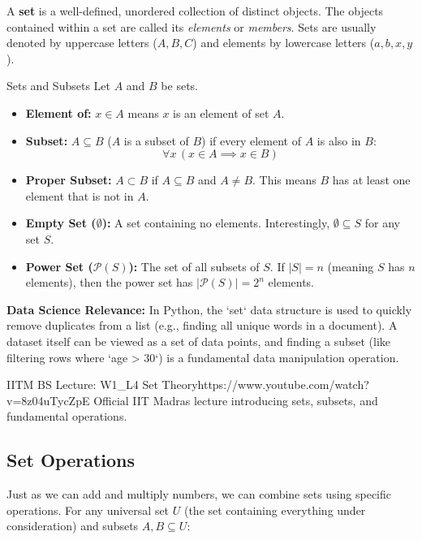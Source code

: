 A \textbf{set} is a well-defined, unordered collection of distinct objects. The objects contained within a set are called its \textit{elements} or \textit{members}. Sets are usually denoted by uppercase letters ($A, B, C$) and elements by lowercase letters ($a, b, x, y$).

\begin{definitionbox}{Sets and Subsets}
Let $A$ and $B$ be sets.
\begin{itemize}
    \item \textbf{Element of:} $x \in A$ means $x$ is an element of set $A$.
    \item \textbf{Subset:} $A \subseteq B$ ($A$ is a subset of $B$) if every element of $A$ is also in $B$:
    $$\forall x \, (x \in A \implies x \in B)$$
    \item \textbf{Proper Subset:} $A \subset B$ if $A \subseteq B$ and $A \neq B$. This means $B$ has at least one element that is not in $A$.
    \item \textbf{Empty Set ($\emptyset$):} A set containing no elements. Interestingly, $\emptyset \subseteq S$ for any set $S$.
    \item \textbf{Power Set ($\mathcal{P}(S)$):} The set of all subsets of $S$. If $|S| = n$ (meaning $S$ has $n$ elements), then the power set has $|\mathcal{P}(S)| = 2^n$ elements.
\end{itemize}
\end{definitionbox}

\textbf{Data Science Relevance:} In Python, the `set` data structure is used to quickly remove duplicates from a list (e.g., finding all unique words in a document). A dataset itself can be viewed as a set of data points, and finding a subset (like filtering rows where `age > 30`) is a fundamental data manipulation operation.

\begin{videocard}{IITM BS Lecture: W1\_L4 Set Theory}{https://www.youtube.com/watch?v=8z04uTycZpE}
Official IIT Madras lecture introducing sets, subsets, and fundamental operations.
\end{videocard}

\subsection{Set Operations}

Just as we can add and multiply numbers, we can combine sets using specific operations. For any universal set $U$ (the set containing everything under consideration) and subsets $A, B \subseteq U$:

